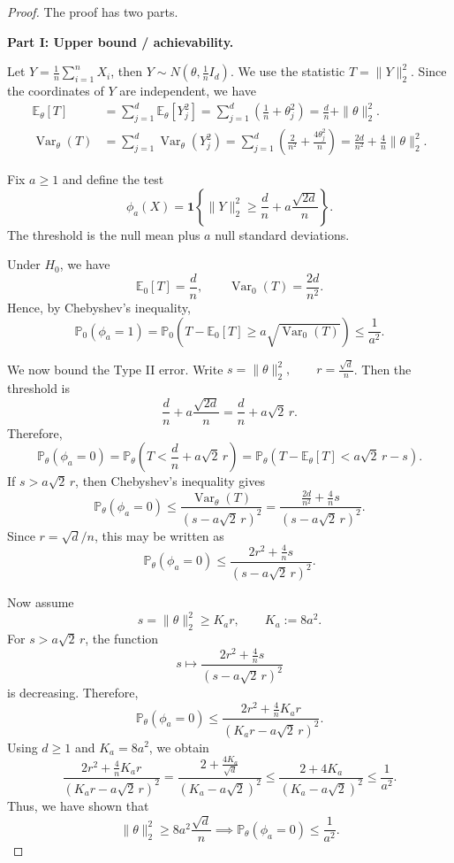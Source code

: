 \begin{proof}
The proof has two parts.

\medskip

\noindent\textbf{Part I: Upper bound / achievability.}

Let \(Y=\frac1n\sum_{i=1}^n X_i\), then
\(
Y\sim N\left(\theta,\frac1n I_d\right).
\)
We use the statistic
\(
T=\|Y\|_2^2.
\)
Since the coordinates of $Y$ are independent, we have
\begin{align*}
\mathbb E_\theta[T]
&=
\sum_{j=1}^d \mathbb E_\theta[Y_j^2]
=
\sum_{j=1}^d\left(\frac1n+\theta_j^2\right)
=
\frac dn+\|\theta\|_2^2.\\
\operatorname{Var}_\theta(T)
&=
\sum_{j=1}^d \operatorname{Var}_\theta(Y_j^2)
=
\sum_{j=1}^d\left(\frac{2}{n^2}+\frac{4\theta_j^2}{n}\right)
=
\frac{2d}{n^2}+\frac4n\|\theta\|_2^2.
\end{align*}

Fix $a\ge 1$ and define the test
\[
\phi_a(X)
=
\mathbf 1\left\{
\|Y\|_2^2
\ge
\frac dn+a\frac{\sqrt{2d}}{n}
\right\}.
\]
The threshold is the null mean plus $a$ null standard deviations.

Under $H_0$, we have
\[
\mathbb E_0[T]=\frac dn,
\qquad
\operatorname{Var}_0(T)=\frac{2d}{n^2}.
\]
Hence, by Chebyshev's inequality,
\[
\mathbb P_0(\phi_a=1)
=
\mathbb P_0\left(
T-\mathbb E_0[T]
\ge
a\sqrt{\operatorname{Var}_0(T)}
\right)
\le
\frac1{a^2}.
\]

We now bound the Type II error. Write
\(
s=\|\theta\|_2^2,
\qquad
r=\frac{\sqrt d}{n}
\). Then the threshold is
\[
\frac dn+a\frac{\sqrt{2d}}n
=
\frac dn+a\sqrt{2}\,r.
\]
Therefore,
\[
\mathbb P_\theta(\phi_a=0)
=
\mathbb P_\theta\left(
T
<
\frac dn+a\sqrt2\,r
\right)
=
\mathbb P_\theta\left(
T-\mathbb E_\theta[T]
<
a\sqrt2\,r-s
\right).
\]
If $s>a\sqrt2\,r$, then Chebyshev's inequality gives
\[
\mathbb P_\theta(\phi_a=0)
\le
\frac{\operatorname{Var}_\theta(T)}{(s-a\sqrt2\,r)^2}
=
\frac{\frac{2d}{n^2}+\frac4n s}{(s-a\sqrt2\,r)^2}.
\]
Since $r=\sqrt d/n$, this may be written as
\[
\mathbb P_\theta(\phi_a=0)
\le
\frac{2r^2+\frac4n s}{(s-a\sqrt2\,r)^2}.
\]

Now assume
\[
s=\|\theta\|_2^2 \ge K_a r,
\qquad
K_a:=8a^2.
\]
For $s>a\sqrt2\,r$, the function
\[
s\mapsto
\frac{2r^2+\frac4n s}{(s-a\sqrt2\,r)^2}
\]
is decreasing. Therefore,
\[
\mathbb P_\theta(\phi_a=0)
\le
\frac{2r^2+\frac4n K_a r}{(K_a r-a\sqrt2\,r)^2}.
\]
Using $d\ge 1$ and $K_a=8a^2$, we obtain
\[
\frac{2r^2+\frac4n K_a r}{(K_a r-a\sqrt2\,r)^2}
=
\frac{2+\frac{4K_a}{\sqrt d}}{(K_a-a\sqrt2)^2}
\le
\frac{2+4K_a}{(K_a-a\sqrt2)^2}\le
\frac1{a^2}.
\]
Thus, we have shown that
\[
\|\theta\|_2^2
\ge
8a^2\frac{\sqrt d}{n} \implies 
\mathbb P_\theta(\phi_a=0)\le \frac1{a^2}.
\]


\end{proof}
